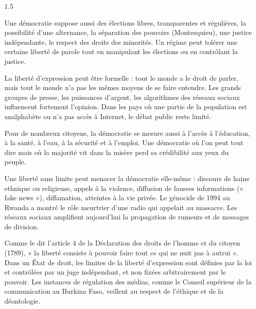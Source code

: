 \documentclass[12pt]{article}
\begin{document}
\begin{spacing}{1.5}


Une démocratie suppose aussi des élections libres, transparentes et régulières, la possibilité d'une alternance, la séparation des pouvoirs (Montesquieu), une justice indépendante, le respect des droits des minorités. Un régime peut tolérer une certaine liberté de parole tout en manipulant les élections ou en contrôlant la justice.

La liberté d'expression peut être formelle : tout le monde a le droit de parler, mais tout le monde n'a pas les mêmes moyens de se faire entendre. Les grands groupes de presse, les puissances d'argent, les algorithmes des réseaux sociaux influencent fortement l'opinion. Dans les pays où une partie de la population est analphabète ou n'a pas accès à Internet, le débat public reste limité.

Pour de nombreux citoyens, la démocratie se mesure aussi à l'accès à l'éducation, à la santé, à l'eau, à la sécurité et à l'emploi. Une démocratie où l'on peut tout dire mais où la majorité vit dans la misère perd sa crédibilité aux yeux du peuple.



Une liberté sans limite peut menacer la démocratie elle-même : discours de haine ethnique ou religieuse, appels à la violence, diffusion de fausses informations (« fake news »), diffamation, atteintes à la vie privée. Le génocide de 1994 au Rwanda a montré le rôle meurtrier d'une radio qui appelait au massacre. Les réseaux sociaux amplifient aujourd'hui la propagation de rumeurs et de messages de division.

Comme le dit l'article 4 de la Déclaration des droits de l'homme et du citoyen (1789), « la liberté consiste à pouvoir faire tout ce qui ne nuit pas à autrui ». Dans un État de droit, les limites de la liberté d'expression sont définies par la loi et contrôlées par un juge indépendant, et non fixées arbitrairement par le pouvoir. Les instances de régulation des médias, comme le Conseil supérieur de la communication au Burkina Faso, veillent au respect de l'éthique et de la déontologie.


\end{spacing}
\end{document}
